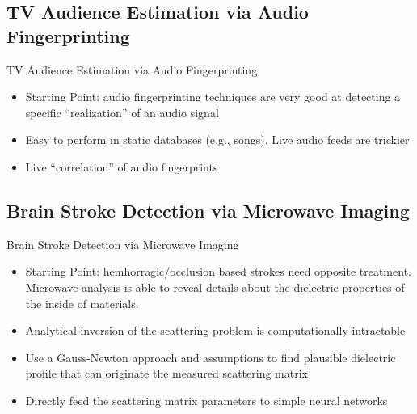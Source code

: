 \documentclass{if-beamer}
\begin{document}
\subsection{TV Audience Estimation via Audio Fingerprinting}
\begin{frame}
TV Audience Estimation via Audio Fingerprinting


\begin{itemize}
\item Starting Point: audio fingerprinting techniques are very good at detecting a specific ``realization'' of an audio signal 
\item Easy to perform in static databases (e.g., songs). Live audio feeds are trickier
\item Live ``correlation'' of audio fingerprints 
\end{itemize}
\end{frame}


\subsection{Brain Stroke Detection via Microwave Imaging}
\begin{frame}
Brain Stroke Detection via Microwave Imaging


\begin{itemize}
\item Starting Point: hemhorragic/occlusion based strokes need opposite treatment. Microwave analysis is able to reveal details about the dielectric properties of the inside of materials.
\item Analytical inversion of the scattering problem is computationally intractable 
\item Use a Gauss-Newton approach and assumptions to find plausible dielectric profile that can originate the measured scattering matrix
\item Directly feed the scattering matrix parameters to simple neural networks
\end{itemize}
\end{frame}
\fi
\end{document}
